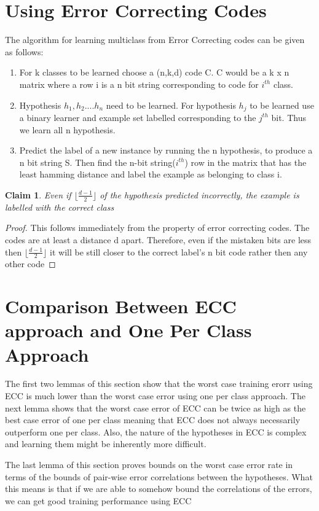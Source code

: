 \documentclass[11pt]{article}
\newtheorem{claim}[theorem]{Claim}
\begin{document}
\section{Using Error Correcting Codes}
    The algorithm for learning multiclass from Error Correcting codes can be given as follows:
    \begin{enumerate}
        \item For k classes to be learned choose a (n,k,d) code C. C would be a k x n matrix where a row i is a n bit string corresponding to code for $i^{th}$ class.
        \item Hypothesis $h_1,h_2....h_n$ need to be learned. For hypothesis $h_j$ to be learned use a binary learner and example set labelled corresponding to the $j^{th}$ bit. Thus we learn all n hypothesis.
        \item Predict the label of a new instance by running the n hypothesis, to produce a n bit string S. Then find the n-bit string($i^{th}$) row in the matrix that has the least hamming distance and label the example as belonging to class i.
    \end{enumerate}
    \begin{claim}
        Even if $\lfloor\frac{d-1}{2}\rfloor$ of the hypothesis predicted incorrectly, the example is labelled with the correct class
    \end{claim}
   \begin{proof}
        This follows immediately from the property of error correcting codes. The codes are at least a distance d apart. Therefore, even if the mistaken bits are less then $\lfloor\frac{d-1}{2}\rfloor$ it will be still closer to the correct label's n bit code rather then any other code
    \end{proof}
    
\section{Comparison Between ECC approach and One Per Class Approach}
The first two lemmas of this section show that the worst case training erorr using ECC is much lower than the worst case error using one per class approach. The next lemma shows that the worst case error of ECC can be twice as high as the best case error of one per class meaning that ECC does not always necessarily outperform one per class. Also, the nature of the hypotheses in ECC is complex and learning them might be inherently more difficult. 

The last lemma of this section proves bounds on the worst case error rate in terms of the bounds of pair-wise error correlations between the hypotheses. What this means is that if we are able to somehow bound the correlations of the errors, we can get good training performance using ECC
\end{document}
